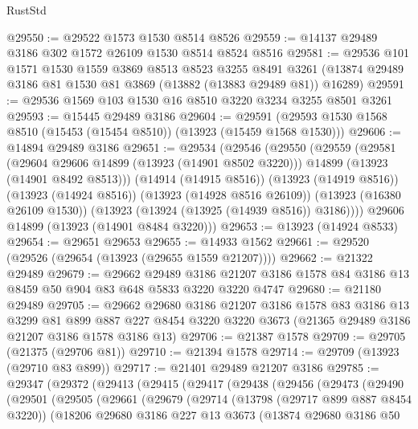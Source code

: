 \begin{lexlean}{RustStd}
\begin{coremodule}
@29550 := @29522 @1573 @1530 @8514 @8526
@29559 := @14137 @29489 @3186 @302 @1572 @26109 @1530 @8514 @8524 @8516
@29581 := @29536
    @101
    @1571
    @1530
    @1559
    @3869
    @8513
    @8523
    @3255
    @8491
    @3261
    (@13874 @29489 @3186 @81 @1530 @81 @3869 (@13882 (@13883 @29489 @81)) @16289)
@29591 := @29536 @1569 @103 @1530 @16 @8510 @3220 @3234 @3255 @8501 @3261
@29593 := @15445 @29489 @3186
@29604 := @29591 (@29593 @1530 @1568 @8510 (@15453 (@15454 @8510)) (@13923 (@15459 @1568 @1530)))
@29606 := @14894 @29489 @3186
@29651 := @29534
    (@29546
      (@29550
        (@29559
          (@29581
            (@29604 @29606 @14899 (@13923 (@14901 @8502 @3220)))
            @14899
            (@13923 (@14901 @8492 @8513)))
          (@14914 (@14915 @8516))
          (@13923 (@14919 @8516))
          (@13923 (@14924 @8516))
          (@13923 (@14928 @8516 @26109))
          (@13923 (@16380 @26109 @1530))
          (@13923 (@13924 (@13925 (@14939 @8516)) @3186))))
      @29606
      @14899
      (@13923 (@14901 @8484 @3220)))
@29653 := @13923 (@14924 @8533)
@29654 := @29651 @29653
@29655 := @14933 @1562
@29661 := @29520 (@29526 (@29654 (@13923 (@29655 @1559 @21207))))
@29662 := @21322 @29489
@29679 := @29662
    @29489
    @3186
    @21207
    @3186
    @1578
    @84
    @3186
    @13
    @8459
    @50
    @904
    @83
    @648
    @5833
    @3220
    @3220
    @4747
@29680 := @21180 @29489
@29705 := @29662
    @29680
    @3186
    @21207
    @3186
    @1578
    @83
    @3186
    @13
    @3299
    @81
    @899
    @887
    @227
    @8454
    @3220
    @3220
    @3673
    (@21365 @29489 @3186 @21207 @3186 @1578 @3186 @13)
@29706 := @21387 @1578
@29709 := @29705 (@21375 (@29706 @81))
@29710 := @21394 @1578
@29714 := @29709 (@13923 (@29710 @83 @899))
@29717 := @21401 @29489 @21207 @3186
@29785 := @29347
    (@29372
      (@29413
        (@29415
          (@29417
            (@29438
              (@29456
                (@29473
                  (@29490
                    (@29501
                      (@29505
                        (@29661
                          (@29679
                            (@29714
                              (@13798 (@29717 @899 @887 @8454 @3220))
                              (@18206
                                @29680
                                @3186
                                @227
                                @13
                                @3673
                                (@13874
                                  @29680
                                  @3186
                                  @50

\end{coremodule}
\end{lexlean}
